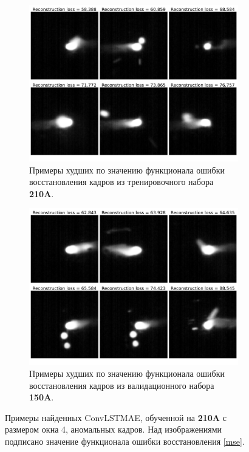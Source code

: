 \documentclass{article}
\begin{document}
    \begin{figure}[H]
        \centering
        \begin{subfigure}{.47\textwidth}
            \centering
            \includegraphics[scale=.15]{model_4_train_worst.pdf}
            \caption{Примеры худших по значению функционала ошибки восстановления кадров из тренировочного набора \textbf{210A}.}\label{model_4_train_worst}
        \end{subfigure}
        \hfill
        \begin{subfigure}{.47\textwidth}
            \centering
            \includegraphics[scale=.15]{model_4_test_worst.pdf}
            \caption{Примеры худших по значению функционала ошибки восстановления кадров из валидационного набора \textbf{150A}.}\label{model_4_test_worst}
        \end{subfigure}
        \caption{Примеры найденных ConvLSTMAE, обученной на \textbf{210A} с размером окна 4, аномальных кадров. Над изображениями подписано значение функционала ошибки восстановления \eqref{mse}.}\label{lstm_worst_before}
    \end{figure}
\end{document}
